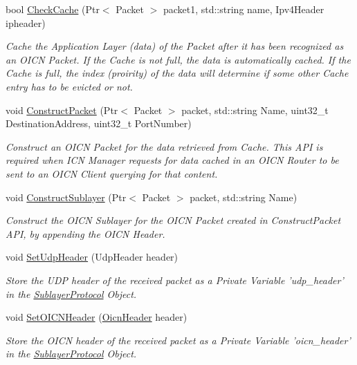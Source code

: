 \begin{DoxyCompactItemize}
bool \hyperlink{classns3_1_1SublayerProtocol_ab20bc8c1fc3159d107d5a3bd41947cdf}{Check\-Cache} (Ptr$<$ Packet $>$ packet1, std\-::string name, Ipv4\-Header ipheader)
\begin{DoxyCompactList}\small\item\em Cache the Application Layer (data) of the Packet after it has been recognized as an O\-I\-C\-N Packet. If the Cache is not full, the data is automatically cached. If the Cache is full, the index (proirity) of the data will determine if some other Cache entry has to be evicted or not. \end{DoxyCompactList}\item 
void \hyperlink{classns3_1_1SublayerProtocol_a5093c7a024d789cab4243e15853cb0db}{Construct\-Packet} (Ptr$<$ Packet $>$ packet, std\-::string Name, uint32\-\_\-t Destination\-Address, uint32\-\_\-t Port\-Number)
\begin{DoxyCompactList}\small\item\em Construct an O\-I\-C\-N Packet for the data retrieved from Cache. This A\-P\-I is required when I\-C\-N Manager requests for data cached in an O\-I\-C\-N Router to be sent to an O\-I\-C\-N Client querying for that content. \end{DoxyCompactList}\item 
void \hyperlink{classns3_1_1SublayerProtocol_a0ad1a28cff0ceeca6086251b4ef26b12}{Construct\-Sublayer} (Ptr$<$ Packet $>$ packet, std\-::string Name)
\begin{DoxyCompactList}\small\item\em Construct the O\-I\-C\-N Sublayer for the O\-I\-C\-N Packet created in Construct\-Packet A\-P\-I, by appending the O\-I\-C\-N Header. \end{DoxyCompactList}\item 
void \hyperlink{classns3_1_1SublayerProtocol_a31827df98334d1c401ad68feaca4105a}{Set\-Udp\-Header} (Udp\-Header header)
\begin{DoxyCompactList}\small\item\em Store the U\-D\-P header of the received packet as a Private Variable 'udp\-\_\-header' in the \hyperlink{classns3_1_1SublayerProtocol}{Sublayer\-Protocol} Object. \end{DoxyCompactList}\item 
void \hyperlink{classns3_1_1SublayerProtocol_a7416f03d29385e56d5b42ed136b7db91}{Set\-O\-I\-C\-N\-Header} (\hyperlink{classns3_1_1OicnHeader}{Oicn\-Header} header)
\begin{DoxyCompactList}\small\item\em Store the O\-I\-C\-N header of the received packet as a Private Variable 'oicn\-\_\-header' in the \hyperlink{classns3_1_1SublayerProtocol}{Sublayer\-Protocol} Object. \end{DoxyCompactList}\item 

\end{DoxyCompactItemize}
